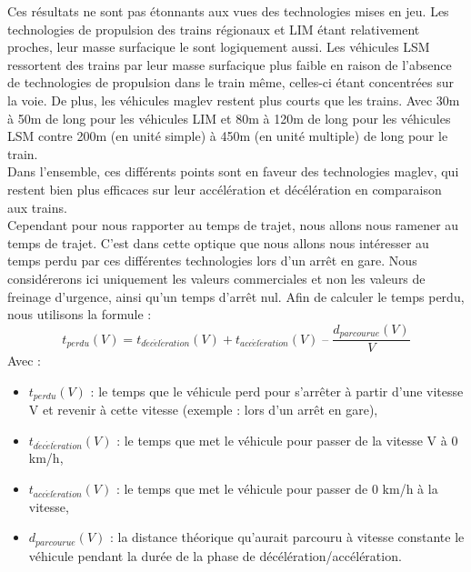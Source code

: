 \documentclass[12pt, a4paper, onecolumn]{article}
\renewcommand{\tab}{\tabto{15px}}
\begin{document}
\tab Ces résultats ne sont pas étonnants aux vues des technologies mises en jeu.
Les technologies de propulsion des trains régionaux et LIM étant relativement proches, leur masse surfacique le sont logiquement aussi.
Les véhicules LSM ressortent des trains par leur masse surfacique plus faible en raison de l’absence de technologies de propulsion dans le train même, celles-ci étant concentrées sur la voie.
De plus, les véhicules maglev restent plus courts que les trains.
Avec 30m à 50m de long pour les véhicules LIM et 80m à 120m de long pour les véhicules LSM contre 200m (en unité simple) à 450m (en unité multiple) de long pour le train. \\
\linebreak
\tab Dans l’ensemble, ces différents points sont en faveur des technologies maglev, qui restent bien plus efficaces sur leur accélération et décélération en comparaison aux trains. \\
\tab Cependant pour nous rapporter au temps de trajet, nous allons nous ramener au temps de trajet.
C’est dans cette optique que nous allons nous intéresser au temps perdu par ces différentes technologies lors d’un arrêt en gare.
Nous considérerons ici uniquement les valeurs commerciales et non les valeurs de freinage d’urgence, ainsi qu'un temps d'arrêt nul.
Afin de calculer le temps perdu, nous utilisons la formule : \\
$$t_{perdu}(V) = t_{d\acute{e}c\acute{e}l\acute{e}ration}(V) + t_{acc\acute{e}l\acute{e}ration}(V) \; – \; \frac{d_{parcourue}(V)}{V}$$
\noindent Avec :
\begin{itemize}
  \item $t_{perdu}(V)$ : le temps que le véhicule perd pour s’arrêter à partir d’une vitesse V et revenir à cette vitesse (exemple : lors d'un arrêt en gare),
  \item $t_{d\acute{e}c\acute{e}l\acute{e}ration}(V)$ : le temps que met le véhicule pour passer de la vitesse V à 0 km/h,
  \item $t_{acc\acute{e}l\acute{e}ration}(V)$ : le temps que met le véhicule pour passer de 0 km/h à la vitesse,
  \item $d_{parcourue}(V)$ : la distance théorique qu'aurait parcouru à vitesse constante le véhicule pendant la durée de la phase de décélération/accélération.
\end{itemize}
\end{document}
